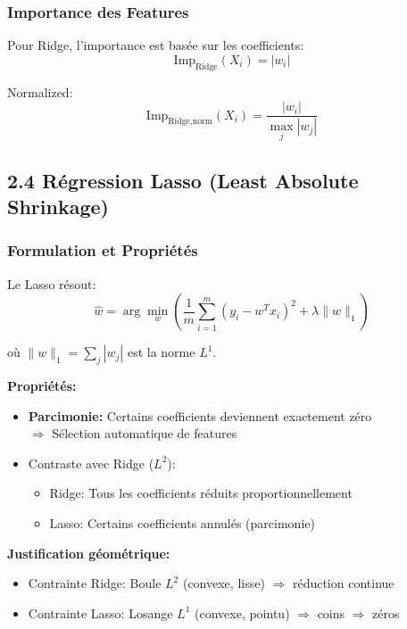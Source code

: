 \documentclass[12pt,a4paper,french]{article}
\begin{document}
\subsubsection{Importance des Features}

Pour Ridge, l'importance est basée sur les coefficients:
\begin{equation}
\text{Imp}_{\text{Ridge}}(X_i) = |w_i|
\end{equation}

Normalized:
\begin{equation}
\text{Imp}_{\text{Ridge,norm}}(X_i) = \frac{|w_i|}{\max_j |w_j|}
\end{equation}

\subsection{2.4 Régression Lasso (Least Absolute Shrinkage)}

\subsubsection{Formulation et Propriétés}

Le Lasso résout:
\begin{equation}
\hat{w} = \arg\min_w \left( \frac{1}{m} \sum_{i=1}^m (y_i - w^T x_i)^2 + \lambda \|w\|_1 \right)
\end{equation}

où $\|w\|_1 = \sum_j |w_j|$ est la norme $L^1$.

\textbf{Propriétés:}
\begin{itemize}
    \item \textbf{Parcimonie:} Certains coefficients deviennent exactement zéro
        \\ $\Rightarrow$ Sélection automatique de features
    
    \item Contraste avec Ridge ($L^2$):
        \begin{itemize}
            \item Ridge: Tous les coefficients réduits proportionnellement
            \item Lasso: Certains coefficients annulés (parcimonie)
        \end{itemize}
\end{itemize}

\textbf{Justification géométrique:}
\begin{itemize}
    \item Contrainte Ridge: Boule $L^2$ (convexe, lisse) $\Rightarrow$ réduction continue
    \item Contrainte Lasso: Losange $L^1$ (convexe, pointu) $\Rightarrow$ coins $\Rightarrow$ zéros
\end{itemize}
\end{document}

